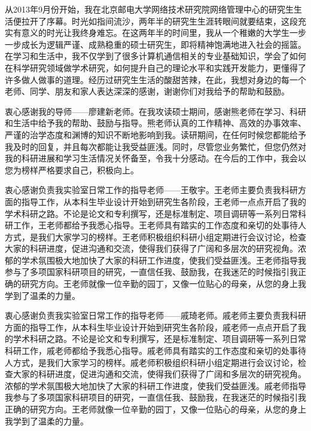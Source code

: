 
\begin{acknowledgement}
从2013年9月份开始，我在北京邮电大学网络技术研究院网络管理中心的研究生生活便拉开了序幕。时光如指间流沙，两年半的研究生生涯转眼间就要结束，这段充实有意义的时光让我终身难忘。在这两年半的时间里，我从一个稚嫩的大学生一步一步成长为逻辑严谨、成熟稳重的硕士研究生，即将精神饱满地进入社会的摇篮。在学习和生活中，我不仅学到了很多计算机通信相关的专业基础知识，学会了如何在科学研究领域做学术研究，如何提升自己的理论水平和实践开发能力，更懂得了许多做人做事的道理。经历过研究生生活的酸甜苦辣，在此，我想对身边的每一个老师、同学、朋友和家人表达深深的感谢，谢谢你们对我给予的帮助和鼓励。

衷心感谢我的导师——廖建新老师。在我攻读硕士期间，感谢熊老师在学习、科研和生活中给予我的帮助、鼓励与指导。熊老师认真的工作精神、高效的办事效率、严谨的治学态度和渊博的知识不断地影响到我。读研期间，在任何时候您都能给予我及时的回复，并且每次都能让我受益匪浅。同时，尽管您业务繁忙，但您仍然对我的科研进展和学习生活情况关怀备至，令我十分感动。在今后的工作中，我会以您为榜样严格要求自己，积极向上。

衷心感谢负责我实验室日常工作的指导老师——王敬宇。王老师主要负责我科研方面的指导工作，从本科生毕业设计开始到研究生各阶段，王老师一点点开启了我的学术科研之路。不论是论文和专利撰写，还是标准制定、项目调研等一系列日常科研工作，王老师都给予我悉心指导。王老师具有踏实的工作态度和亲切的处事待人方式，是我们大家学习的榜样。王老师积极组织科研小组定期进行会议讨论，检查大家的科研进度，促进沟通和交流，使得我们获得了广阔和多层次的研究视角。浓郁的学术氛围极大地加快了大家的科研工作进度，使我们受益匪浅。王老师指导我参与了多项国家科研项目的研究，一直信任我、鼓励我，在我迷茫的时候指引我正确的研究方向。王老师就像一位辛勤的园丁，又像一位贴心的母亲，从您的身上我学到了温柔的力量。

衷心感谢负责我实验室日常工作的指导老师——戚琦老师。戚老师主要负责我科研方面的指导工作，从本科生毕业设计开始到研究生各阶段，戚老师一点点开启了我的学术科研之路。不论是论文和专利撰写，还是标准制定、项目调研等一系列日常科研工作，戚老师都给予我悉心指导。戚老师具有踏实的工作态度和亲切的处事待人方式，是我们大家学习的榜样。戚老师积极组织科研小组定期进行会议讨论，检查大家的科研进度，促进沟通和交流，使得我们获得了广阔和多层次的研究视角。浓郁的学术氛围极大地加快了大家的科研工作进度，使我们受益匪浅。戚老师指导我参与了多项国家科研项目的研究，一直信任我、鼓励我，在我迷茫的时候指引我正确的研究方向。王老师就像一位辛勤的园丁，又像一位贴心的母亲，从您的身上我学到了温柔的力量。


\end{acknowledgement}
